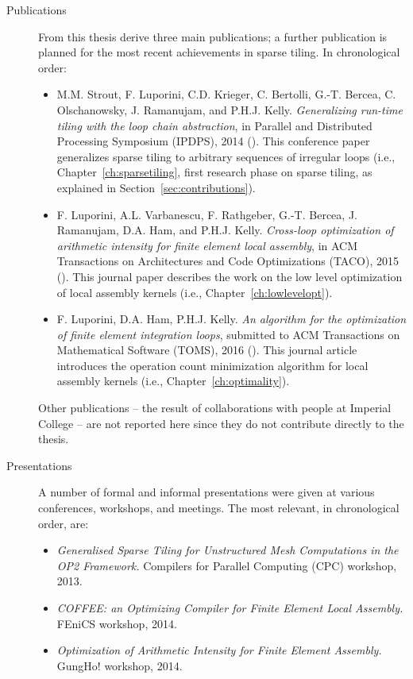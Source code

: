 \begin{description}
\item[Publications] From this thesis derive three main publications; a further publication is planned for the most recent achievements in sparse tiling. In chronological order:
\begin{itemize}
\item M.M. Strout, F. Luporini, C.D. Krieger, C. Bertolli, G.-T. Bercea, C. Olschanowsky, J. Ramanujam, and P.H.J. Kelly. {\em Generalizing run-time tiling with the loop chain abstraction}, in Parallel and Distributed Processing Symposium (IPDPS), 2014 (\cite{st-paper}). This conference paper generalizes sparse tiling to arbitrary sequences of irregular loops (i.e., Chapter~\ref{ch:sparsetiling}, first research phase on sparse tiling, as explained in Section~\ref{sec:contributions}).
\item F. Luporini, A.L. Varbanescu, F. Rathgeber, G.-T. Bercea, J. Ramanujam, D.A. Ham, and P.H.J. Kelly. {\em Cross-loop optimization of arithmetic intensity for finite element local assembly}, in ACM Transactions on Architectures and Code Optimizations (TACO), 2015 (\cite{Luporini-coffee}). This journal paper describes the work on the low level optimization of local assembly kernels (i.e., Chapter~\ref{ch:lowlevelopt}).
\item F. Luporini, D.A. Ham, P.H.J. Kelly. {\em An algorithm for the optimization of finite element integration loops}, submitted to ACM Transactions on Mathematical Software (TOMS), 2016 (\cite{Luporini-minimalflops}). This journal article introduces the operation count minimization algorithm for local assembly kernels (i.e., Chapter~\ref{ch:optimality}).
\end{itemize}
Other publications -- the result of collaborations with people at Imperial College -- are not reported here since they do not contribute directly to the thesis.
\item[Presentations] A number of formal and informal presentations were given at various conferences, workshops, and meetings. The most relevant, in chronological order, are:
\begin{itemize}
\item {\em Generalised Sparse Tiling for Unstructured Mesh Computations in the OP2 Framework.} Compilers for Parallel Computing (CPC) workshop, 2013.
\item {\em COFFEE: an Optimizing Compiler for Finite Element Local Assembly.} FEniCS workshop, 2014.
\item {\em Optimization of Arithmetic Intensity for Finite Element Assembly.} GungHo! workshop, 2014.

\end{itemize}
\end{description}
